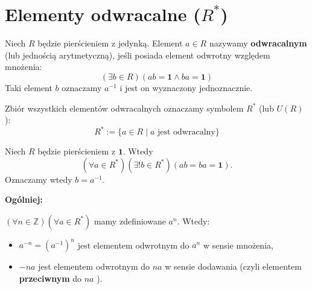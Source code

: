 \section{Elementy odwracalne ($R^*$)}

\begin{definition}
    Niech $R$ będzie pierścieniem z jedynką. Element $a \in R$ nazywamy \textbf{odwracalnym} (lub jednością arytmetyczną), jeśli posiada element odwrotny względem mnożenia:
    \[ (\exists b \in R) (ab = \mathbf{1} \land ba = \mathbf{1}) \]
    Taki element $b$ oznaczamy $a^{-1}$ i jest on wyznaczony jednoznacznie.
    
    Zbiór wszystkich elementów odwracalnych oznaczamy symbolem $R^*$ (lub $U(R)$):
    \[ R^* := \{ a \in R \mid a \text{ jest odwracalny} \} \]
\end{definition}
\begin{remark}
	Niech $R$ będzie pierścieniem z $\mathbf{1}$.
	Wtedy
	\[
	\left(\forall a \in R^{\ast} \right)\left(\exists !b\in R^{\ast} \right)\left( ab = ba = \mathbf{1} \right)   
	.\] 
	Oznaczamy wtedy $b = a^{-1}$.

	\noindent \textbf{Ogólniej:}

	$\left(\forall n\in \mathbb{Z}  \right)\left(\forall a \in R^{\ast} \right)  $ mamy zdefiniowane $a^{n}$. Wtedy:
	\begin{itemize}
		\item $a^{-n} = \left( a^{-1} \right)^{n}$ jest elementem odwrotnym do $a^{n}$ w sensie mnożenia,
		\item $-na$ jest elementem odwrotnym do $na$ w sensie dodawania (czyli elementem \textbf{przeciwnym} do $na$ ).
	\end{itemize}
\end{remark}

